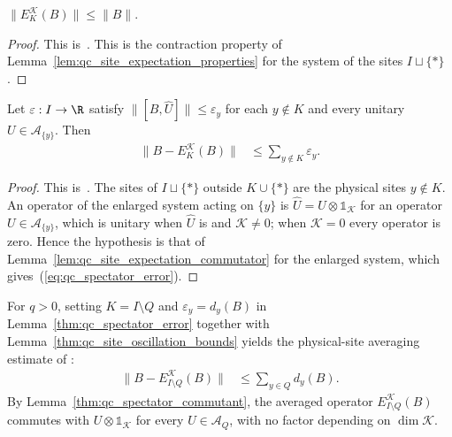 \begin{lemma}
    \label{thm:qc_spectator_contraction}
    \leanok
    $\|E_K^{\mathcal K}(B)\|\le\|B\|$.
\end{lemma}
\begin{proof}
    \leanok
    This is~\cite[``Contraction with an arbitrary
        spectator'']{QICLean2026Blueprint}.
    This is the contraction property of Lemma~\ref{lem:qc_site_expectation_properties}
    for the system of the sites $I\sqcup\{\ast\}$.
\end{proof}

\begin{lemma}
    \label{thm:qc_spectator_error}
    \leanok
    Let $\varepsilon:I\to\R$ satisfy
    $\|[B,\widehat U]\|\le\varepsilon_y$ for each $y\notin K$ and
    every unitary $U\in\mathcal A_{\{y\}}$. Then
    \begin{align}
        \|B-E_K^{\mathcal K}(B)\|
         & \le\sum_{y\notin K}\varepsilon_y.
        \label{eq:qc_spectator_error}
    \end{align}
\end{lemma}
\begin{proof}
    \leanok
    This is~\cite[``Averaging error from on-site commutator
        bounds'']{QICLean2026Blueprint}.
    The sites of $I\sqcup\{\ast\}$ outside $K\cup\{\ast\}$ are the physical
    sites $y\notin K$. An operator of the enlarged system acting on $\{y\}$ is
    $\widehat U=U\otimes\mathbb 1_{\mathcal K}$ for an operator
    $U\in\mathcal A_{\{y\}}$, which is unitary when $\widehat U$ is and
    $\mathcal K\neq0$; when $\mathcal K=0$ every operator is zero. Hence the
    hypothesis is that of Lemma~\ref{lem:qc_site_expectation_commutator} for
    the enlarged system, which gives~(\ref{eq:qc_spectator_error}).
\end{proof}

For $q>0$, setting $K=I\setminus Q$ and $\varepsilon_y=d_y(B)$ in
Lemma~\ref{thm:qc_spectator_error} together with
Lemma~\ref{thm:qc_site_oscillation_bounds} yields the physical-site
averaging estimate of \cite{OpenAI2026AreaLaw}:
\begin{align}
    \|B-E_{I\setminus Q}^{\mathcal K}(B)\|
     & \le\sum_{y\in Q}d_y(B).
    \label{eq:qc_osc_averaging_error}
\end{align}
By Lemma~\ref{thm:qc_spectator_commutant}, the averaged operator
$E_{I\setminus Q}^{\mathcal K}(B)$ commutes with $U\otimes\mathbb 1_{\mathcal K}$
for every $U\in\mathcal A_Q$, with no factor depending on $\dim\mathcal K$.
